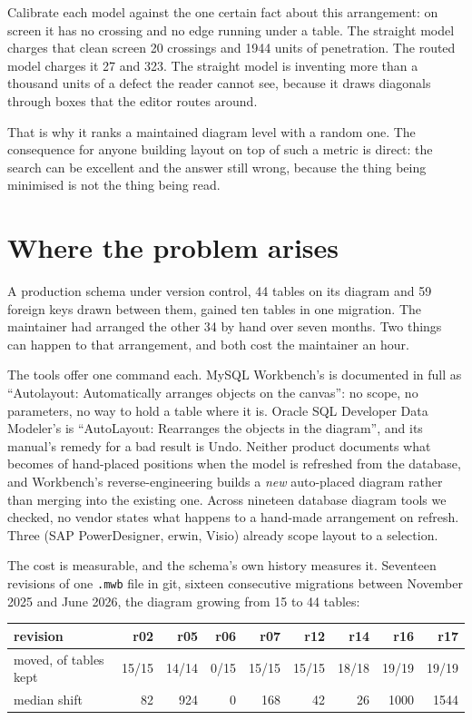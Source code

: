 \documentclass[11pt]{article}
\begin{document}
Calibrate each model against the one certain fact about this arrangement: on screen it has
no crossing and no edge running under a table. The straight model charges that clean screen
20 crossings and 1944 units of penetration. The routed model charges it 27 and 323. The
straight model is inventing more than a thousand units of a defect the reader cannot see,
because it draws diagonals through boxes that the editor routes around.

That is why it ranks a maintained diagram level with a random one. The consequence for
anyone building layout on top of such a metric is direct: the search can be excellent and
the answer still wrong, because the thing being minimised is not the thing being read.

\section{Where the problem arises}
A production schema under version control, 44 tables on its diagram and 59 foreign keys
drawn between them, gained ten tables in one migration. The maintainer had arranged the
other 34 by hand over seven months. Two things can happen to that arrangement, and both
cost the maintainer an hour.

The tools offer one command each. MySQL Workbench's is documented in full as
``Autolayout: Automatically arranges objects on the canvas'': no scope, no parameters, no
way to hold a table where it is. Oracle SQL Developer Data Modeler's is ``AutoLayout:
Rearranges the objects in the diagram'', and its manual's remedy for a bad result is Undo.
Neither product documents what becomes of hand-placed positions when the model is
refreshed from the database, and Workbench's reverse-engineering builds a \emph{new}
auto-placed diagram rather than merging into the existing one. Across nineteen database
diagram tools we checked, no vendor states what happens to a hand-made arrangement on
refresh. Three (SAP PowerDesigner, erwin, Visio) already scope layout to a selection.

The cost is measurable, and the schema's own history measures it. Seventeen revisions of
one \texttt{.mwb} file in git, sixteen consecutive migrations between November 2025 and
June 2026, the diagram growing from 15 to 44 tables:

\begin{center}\small
\begin{tabular}{lrrrrrrrr}
\toprule
revision & r02 & r05 & r06 & r07 & r12 & r14 & r16 & r17 \\
\midrule
moved, of tables kept & 15/15 & 14/14 & 0/15 & 15/15 & 15/15 & 18/18 & 19/19 & 19/19 \\
median shift & 82 & 924 & 0 & 168 & 42 & 26 & 1000 & 1544 \\
\bottomrule
\end{tabular}
\end{center}
\end{document}
